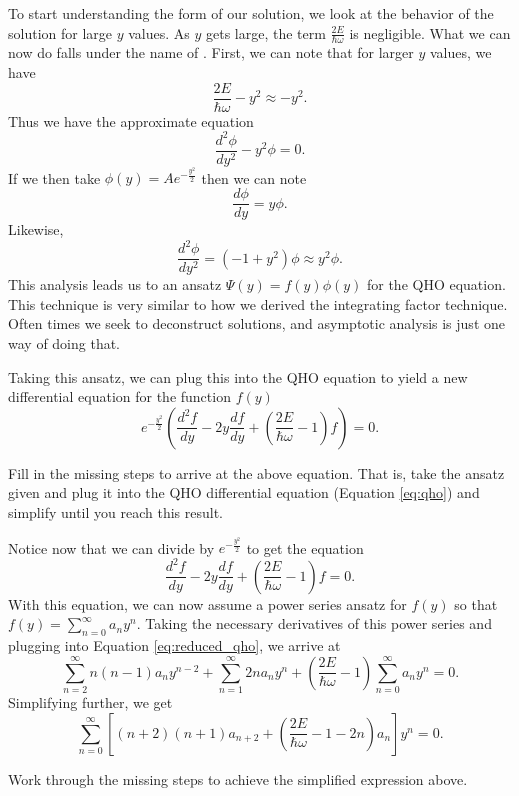 To start understanding the form of our solution, we look at the behavior of the solution for large $y$ values. As  $y$ gets large, the term $\frac{2E}{\hbar \omega}$ is negligible.  What we can now do falls under the name of  .  First, we can note that for larger $y$ values, we have
\[
\frac{2E}{\hbar \omega} - y^2 \approx -y^2.
\]
Thus we have the approximate equation
\[
\frac{d^2 \phi}{dy^2} - y^2 \phi = 0.
\]
If we then take $\phi(y)=Ae^{-\frac{y^2}{2}}$ then we can note
\[
\frac{d \phi}{d y} = y \phi.
\]
Likewise,
\[
\frac{d^2 \phi}{dy^2} = (-1 + y^2)\phi \approx y^2 \phi.
\]
This analysis leads us to an ansatz $\Psi(y)=f(y)\phi(y)$ for the QHO equation.  This technique is very similar to how we derived the integrating factor technique.  Often times we seek to deconstruct solutions, and asymptotic analysis is just one way of doing that.

Taking this ansatz, we can plug this into the QHO equation to yield a new differential equation for the function $f(y)$
\[
e^{-\frac{y^2}{2}} \left(\frac{d^2 f}{dy} - 2y \frac{df}{dy} + \left(\frac{2E}{\hbar \omega} -1\right) f\right) = 0.
\]

\begin{exercise}
    Fill in the missing steps to arrive at the above equation.  That is, take the ansatz given and plug it into the QHO differential equation (Equation \ref{eq:qho}) and simplify until you reach this result.
\end{exercise}

Notice now that we can divide by $e^{-\frac{y^2}{2}}$ to get the equation
\begin{equation}
\label{eq:reduced_qho}
\frac{d^2 f}{dy} - 2y \frac{df}{dy} + \left(\frac{2E}{\hbar \omega} -1\right) f = 0.
\end{equation}
With this equation, we can now assume a power series ansatz for $f(y)$ so that $f(y) = \sum_{n=0}^\infty a_n y^n$.  Taking the necessary derivatives of this power series and plugging into Equation \ref{eq:reduced_qho}, we arrive at
\[
\sum_{n=2}^\infty n(n-1) a_n y^{n-2} +\sum_{n=1}^\infty 2n a_n y^n + \left(\frac{2E}{\hbar \omega} -1 \right) \sum_{n=0}^\infty a_n y^n =0.
\]
Simplifying further, we get
\[
\sum_{n=0}^\infty \left[ (n+2)(n+1) a_{n+2} + \left(\frac{2E}{\hbar \omega} -1-2n\right)a_n \right]y^n = 0.
\]

\begin{exercise}
    Work through the missing steps to achieve the simplified expression above.
\end{exercise}

